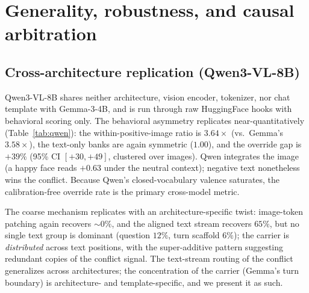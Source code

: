 \documentclass{article}
\newcommand{\gemma}{Gemma-3-4B}
\newcommand{\qwen}{Qwen3-VL-8B}
\begin{document}
\section{Generality, robustness, and causal arbitration}
\label{sec:robustness}

\subsection{Cross-architecture replication (\qwen{})}
\label{sec:qwen}

\qwen{} shares neither architecture, vision encoder, tokenizer, nor chat template with \gemma{}, and is run through raw HuggingFace hooks with behavioral scoring only. The behavioral asymmetry replicates near-quantitatively (Table~\ref{tab:qwen}): the within-positive-image ratio is $3.64\times$ (vs.\ Gemma's $3.58\times$), the text-only banks are again symmetric ($1.00$), and the override gap is $+39\%$ (95\% CI $[+30, +49]$, clustered over images). Qwen integrates the image (a happy face reads $+0.63$ under the neutral context); negative text nonetheless wins the conflict. Because Qwen's closed-vocabulary valence saturates, the calibration-free override rate is the primary cross-model metric.

The coarse mechanism replicates with an architecture-specific twist: image-token patching again recovers ${\sim}0\%$, and the aligned text stream recovers $65\%$, but no single text group is dominant (question $12\%$, turn scaffold $6\%$); the carrier is \emph{distributed} across text positions, with the super-additive pattern suggesting redundant copies of the conflict signal. The text-stream routing of the conflict generalizes across architectures; the concentration of the carrier (Gemma's turn boundary) is architecture- and template-specific, and we present it as such.
\end{document}
